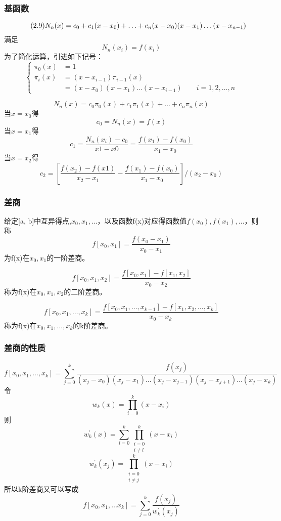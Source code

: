 \documentclass[12pt]{report}
\numberwithin{equation}{section}
\begin{document}
	\subsubsection{基函数}
	\begin{equation} \tag{2.9} \label{2.9}
		\notag
		N_n(x) = c_0 + c_1 (x - x_0) + \ldots + c_n (x - x_0)(x - x_1) \ldots (x - x_{n-1})
	\end{equation}
	满足
	$$
	N_n(x_i) = f(x_i)
	$$
	为了简化运算，引进如下记号：
	\begin{equation} \tag{2.10} \label{2.10}
		\begin{cases}
			\pi_0(x) &= 1 \\
			\pi_i(x) &= (x - x_{i-1}) \pi_{i-1}(x) \\
			&= (x - x_0)(x - x_1) \ldots (x - x_{i-1}) \quad \quad i=1, 2, \ldots , n
		\end{cases}
	\end{equation}
	
	$$
	N_n(x) = c_0 \pi_0(x) + c_1 \pi_1(x) + \ldots + c_n \pi_n(x)
	$$
	当$x = x_0$得
	$$
	c_0 = N_n(x) = f(x)
	$$
	当$x = x_1$得
	$$
	c_1 = \frac{N_n(x_i) - c_0}{x1 - x0} = \frac{f(x_1) - f(x_0)}{x_1 - x_0}
	$$
	当$x = x_2$得
	$$
	c_2 = \left[\frac{f(x_2) - f(x1)}{x_2 - x_1} - \frac{f(x_1) - f(x_0)}{x_1 - x_0}  \right]/(x_2 - x_0) 
	$$

	\subsubsection{差商}
	给定[a, b]中互异得点,$x_0, x_1, \ldots $，以及函数f(x)对应得函数值$f(x_0), f(x_1), \ldots$，则称
	$$
	f[x_0, x_1]=\frac{f(x_0 - x_1)}{x_0 - x_1}
	$$
	为f(x)在$x_0, x_1$的一阶差商。

	$$
	f[x_0, x_1, x_2] = \frac{f[x_0, x_1] - f[x_1, x_2]}{x_0 - x_2}
	$$
	称为f(x)在$x_0, x_1, x_2$的二阶差商。

	$$
	f[x_0, x_1, \ldots , x_k] = \frac{f[x_0, x_1, \ldots , x_{k-1}] - f[x_1, x_2, \ldots , x_k]}{x_0 - x_k}
	$$
	称为f(x)在$x_0, x_1, \ldots , x_k$的k阶差商。

	\subsubsection{差商的性质}
	$$
	f[x_0, x_1, \ldots , x_k] = \sum_{j=0}^k \frac{f(x_j)}{(x_j - x_0)(x_j - x_1)\ldots (x_j - x_{j-1})(x_j - x_{j+1})\ldots (x_j - x_k)}
	$$
	令
	$$
	w_k(x) = \prod_{i=0}^k (x - x_i)
	$$
	则
	$$
	w_k^\prime(x) = \sum_{l=0}^k \prod_{\substack{i=0 \\ i \neq l}}^k (x - x_i)
	$$
	$$
	w_k^\prime(x_j) = \prod_{\substack{i=0 \\ i \neq j}}^k (x - x_i)
	$$
	所以k阶差商又可以写成
	$$
	f[x_0, x_1, \ldots x_k] = \sum_{j=0}^k \frac{f(x_j)}{w_{k}^\prime(x_j)}
	$$
\end{document}
